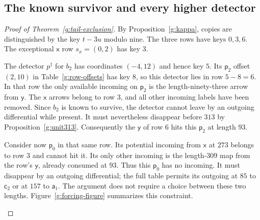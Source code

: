 \documentclass[11pt]{article}
\theoremstyle{definition}
\theoremstyle{remark}
\numberwithin{equation}{section}
\begin{document}
\subsection{The known survivor and every higher detector}

\begin{proof}[Proof of Theorem~\ref{g:tail-exclusion}]
By Proposition~\ref{g:kappa}, copies are distinguished
by the key $t-3u$ modulo nine.  The three rows have
keys $0,3,6$.  The exceptional $\mathsf x$ row
$s_x=(0,2)$ has key $3$.

The detector $p^\dagger$ for $b_2$ has coordinates
$(-4,12)$ and hence key $5$.  Its $\mathsf p_2$
offset $(2,10)$ in Table~\ref{g:row-offsets} has
key $8$, so this detector lies in row $5-8=6$.
In that row the only available incoming on
$\mathsf p_2$ is the length-ninety-three arrow
from $\mathsf y$.  The $\mathsf x$ arrows
belong to row $3$, and all other incoming
labels have been removed.  Since $b_2$ is
known to survive, the detector cannot leave
by an outgoing differential while present.
It must nevertheless disappear before $313$
by Proposition~\ref{g:unit313}.  Consequently
the $\mathsf y$ of row $6$ hits this
$\mathsf p_2$ at length $93$.

Consider now $\mathsf p_0$ in that same row.
Its potential incoming from $\mathsf x$ at
$273$ belongs to row $3$ and cannot hit it.
Its only other incoming is the length-$309$
map from the row's $\mathsf y$, already
consumed at $93$.  Thus this $\mathsf p_0$
has no incoming.  It must disappear by an
outgoing differential; the full table permits
its outgoing at $85$ to $\mathsf c_2$ or
at $157$ to $\mathsf a_1$.  The argument does
not require a choice between these two
lengths. Figure~\ref{g:forcing-figure} summarizes this constraint.

\begin{figure}[htbp]


\end{figure}
\end{proof}
\end{document}
